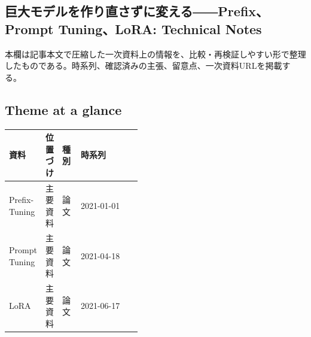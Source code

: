 \subsection*{巨大モデルを作り直さずに変える――Prefix、Prompt Tuning、LoRA: Technical Notes}
本欄は記事本文で圧縮した一次資料上の情報を、比較・再検証しやすい形で整理したものである。時系列、確認済みの主張、留意点、一次資料URLを掲載する。
\smallskip
{}\par
\medskip
\subsection*{Theme at a glance}
\begin{center}
\footnotesize
\begin{tabularx}{\linewidth}{@{}p{0.20\linewidth}p{0.10\linewidth}p{0.14\linewidth}X@{}}
\toprule
資料 & 位置づけ & 種別 & 時系列 \\
\midrule
Prefix-Tuning & 主要資料 & 論文 & 2021-01-01 \\
Prompt Tuning & 主要資料 & 論文 & 2021-04-18 \\
LoRA & 主要資料 & 論文 & 2021-06-17 \\
\bottomrule
\end{tabularx}
\end{center}
\normalsize

